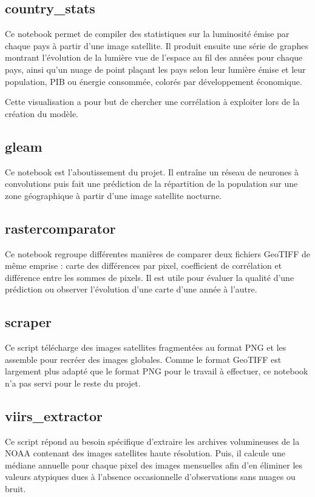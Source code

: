 \documentclass[a4paper, 11pt]{report}
\begin{document}
\subsection{country\_stats}
Ce notebook permet de compiler des statistiques sur la luminosité émise par chaque pays à partir d'une image satellite. Il produit ensuite une série de graphes montrant l'évolution de la lumière vue de l'espace au fil des années pour chaque pays, ainsi qu'un nuage de point plaçant les pays selon leur lumière émise et leur population, PIB ou énergie consommée, colorés par développement économique.

Cette visualisation a pour but de chercher une corrélation à exploiter lors de la création du modèle.

\subsection{gleam}
Ce notebook est l'aboutissement du projet. Il entraîne un réseau de neurones à convolutions puis fait une prédiction de la répartition de la population sur une zone géographique à partir d'une image satellite nocturne.

\subsection{rastercomparator}
Ce notebook regroupe différentes manières de comparer deux fichiers GeoTIFF de même emprise : carte des différences par pixel, coefficient de corrélation et différence entre les sommes de pixels. Il est utile pour évaluer la qualité d'une prédiction ou observer l'évolution d'une carte d'une année à l'autre.

\subsection{scraper}
Ce script télécharge des images satellites fragmentées au format PNG et les assemble pour recréer des images globales. Comme le format GeoTIFF est largement plus adapté que le format PNG pour le travail à effectuer, ce notebook n'a pas servi pour le reste du projet.

\subsection{viirs\_extractor}
Ce script répond au besoin spécifique d'extraire les archives volumineuses  de la NOAA \cite{noaa-viirs} contenant des images satellites haute résolution. Puis, il calcule une médiane annuelle pour chaque pixel des images mensuelles afin d'en éliminer les valeurs atypiques dues à l'absence occasionnelle d'observations sans nuages ou bruit.
\end{document}
